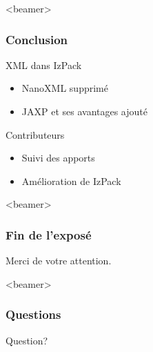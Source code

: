 \begin{frame}<beamer>
\frametitle{Conclusion}
\begin{beamerboxesrounded}[shadow=true]{XML dans IzPack}
\begin{itemize}
	\item NanoXML supprimé
	\item JAXP et ses avantages ajouté
\end{itemize}
\end{beamerboxesrounded}
\vfill
\begin{beamerboxesrounded}[shadow=true]{Contributeurs}
\begin{itemize}
	\item Suivi des apports
	\item Amélioration de IzPack
\end{itemize}
\end{beamerboxesrounded}
\end{frame}
\begin{frame}<beamer>\frametitle{Fin de l'exposé}
\begin{center}
Merci de votre attention.
\end{center}
\end{frame}
\begin{frame}<beamer>\frametitle{Questions}
\begin{center}
Question?
\end{center}
\end{frame}
